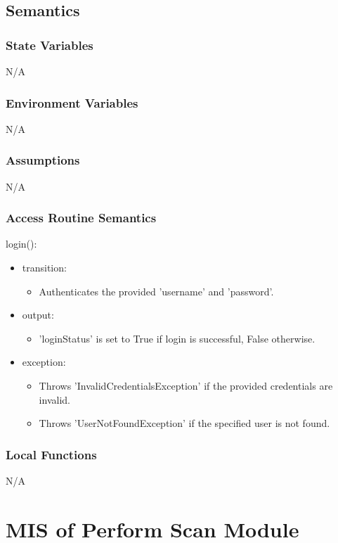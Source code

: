 \documentclass[12pt, titlepage]{article}
\begin{document}
\subsection{Semantics}

\subsubsection{State Variables}
N/A
\subsubsection{Environment Variables}
N/A
\subsubsection{Assumptions}
N/A
\subsubsection{Access Routine Semantics}

\noindent login():
\begin{itemize}
\item transition: \begin{itemize}
    \item Authenticates the provided 'username' and 'password'.
\end{itemize}
\item output: \begin{itemize}
    \item 'loginStatus' is set to True if login is successful, False otherwise.
\end{itemize}
\item exception: \begin{itemize}
    \item Throws 'InvalidCredentialsException' if the provided credentials are invalid.
    \item Throws 'UserNotFoundException' if the specified user is not found.
\end{itemize}
\end{itemize}

\subsubsection{Local Functions}
N/A
\newpage

\section{MIS of Perform Scan Module} \label{Module} 
\end{document}
